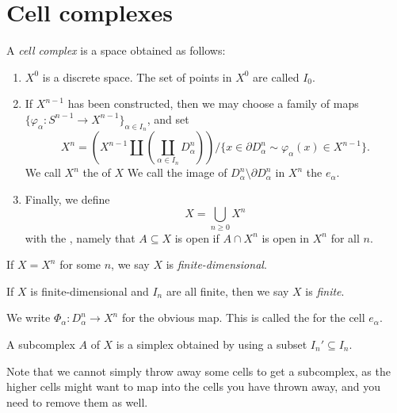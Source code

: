 \documentclass[a4paper]{article}
\begin{document}
\section{Cell complexes}
\begin{defi}
  A \emph{cell complex} is a space obtained as follows:
  \begin{enumerate}
    \item $X^0$ is a discrete space. The set of points in $X^0$ are called $I_0$.
    \item If $X^{n - 1}$ has been constructed, then we may choose a family of maps $\{\varphi_\alpha: S^{n - 1} \to X^{n - 1}\}_{\alpha \in I_n}$, and set
      \[
        X^n = \left(X^{n - 1} \amalg \left(\coprod_{\alpha \in I_n} D_\alpha^n\right) \right)/\{x \in \partial D_\alpha^n \sim \varphi_\alpha(x) \in X^{n - 1}\}.
      \]
      We call $X^n$ the  of $X$ We call the image of $D_\alpha^n \setminus \partial D_\alpha^n$ in $X^n$ the  $e_\alpha$.
    \item Finally, we define
      \[
        X = \bigcup_{n \geq 0} X^n
      \]
      with the , namely that $A \subseteq X$ is open if $A \cap X^n$ is open in $X^n$ for all $n$.
  \end{enumerate}
\end{defi}

\begin{defi}
  If $X = X^n$ for some $n$, we say $X$ is \emph{finite-dimensional}.
\end{defi}

\begin{defi}
  If $X$ is finite-dimensional and $I_n$ are all finite, then we say $X$ is \emph{finite}.
\end{defi}

We write $\Phi_\alpha: D_\alpha^n \to X^n$ for the obvious map. This is called the  for the cell $e_\alpha$.
\begin{defi}[Subcomplex]
  A subcomplex $A$ of $X$ is a simplex obtained by using a subset $I_n' \subseteq I_n$.
\end{defi}
Note that we cannot simply throw away some cells to get a subcomplex, as the higher cells might want to map into the cells you have thrown away, and you need to remove them as well.
\end{document}

